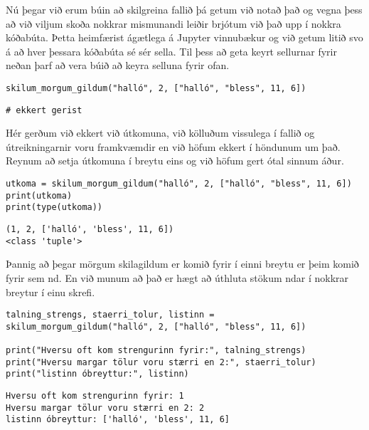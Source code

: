 Nú þegar við erum búin að skilgreina fallið þá getum við notað það og vegna þess að við viljum skoða nokkrar mismunandi leiðir brjótum við það upp í nokkra kóðabúta.
Þetta heimfærist ágætlega á Jupyter vinnubækur og við getum litið svo á að hver þessara kóðabúta sé sér sella.
Til þess að geta keyrt sellurnar fyrir neðan þarf að vera búið að keyra selluna fyrir ofan.

\begin{lstlisting}[caption=Fallið úr kóðabút \ref{lst:foll-ndir-skilagildi} notað án þess að útkoman sé geymd, label=lst:foll-skil1]
skilum_morgum_gildum("halló", 2, ["halló", "bless", 11, 6])
\end{lstlisting}
\lstset{style=uttak}
\begin{lstlisting}
# ekkert gerist
\end{lstlisting}
\lstset{style=venjulegt}

Hér gerðum við ekkert við útkomuna, við kölluðum vissulega í fallið og útreikningarnir voru framkvæmdir en við höfum ekkert í höndunum um það.
Reynum að setja útkomuna í breytu eins og við höfum gert ótal sinnum áður.

\begin{lstlisting}[caption=Fallið úr kóðabút \ref{lst:foll-ndir-skilagildi} notað og útkoman geymd í einni breytu, label=lst:foll-skil2]
utkoma = skilum_morgum_gildum("halló", 2, ["halló", "bless", 11, 6])
print(utkoma)
print(type(utkoma))
\end{lstlisting}
\lstset{style=uttak}
\begin{lstlisting}
(1, 2, ['halló', 'bless', 11, 6])
<class 'tuple'>
\end{lstlisting}
\lstset{style=venjulegt}

Þannig að þegar mörgum skilagildum er komið fyrir í einni breytu er þeim komið fyrir sem nd.
En við munum að það er hægt að úthluta stökum ndar í nokkrar breytur í einu skrefi.

\begin{lstlisting}[caption=Fallið úr kóðabút \ref{lst:foll-ndir-skilagildi} notað og skilagildunum úthlutað í breytur rétt, label=lst:foll-skil3]
talning_strengs, staerri_tolur, listinn = skilum_morgum_gildum("halló", 2, ["halló", "bless", 11, 6])

print("Hversu oft kom strengurinn fyrir:", talning_strengs)
print("Hversu margar tölur voru stærri en 2:", staerri_tolur)
print("listinn óbreyttur:", listinn)
\end{lstlisting}
\lstset{style=uttak}
\begin{lstlisting}
Hversu oft kom strengurinn fyrir: 1
Hversu margar tölur voru stærri en 2: 2
listinn óbreyttur: ['halló', 'bless', 11, 6]
\end{lstlisting}
\lstset{style=venjulegt}

